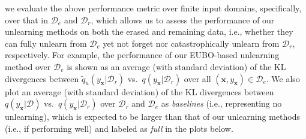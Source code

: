 \documentclass{article}
\theoremstyle{definition}
\newcommand{\mbf}[1]{\mathbf{#1}}
\newcommand{\mcl}[1]{\mathcal{#1}}
\newcommand{\mbb}[1]{\mathbb{#1}}
\newcommand{\da}{\mcl{D}}
\newcommand{\dc}{\mcl{D}_r}
\newcommand{\dr}{\mcl{D}_e}
\newcommand{\eubo}{\tilde{q}_u}
\newcommand{\elbo}{\tilde{q}_v}
\begin{document}
we evaluate the above performance metric over  finite input domains, specifically, over that in $\dr$ and $\dc$, which allows us to assess the 
performance of our unlearning methods on both the erased and remaining data, i.e., whether they can fully unlearn from $\dr$ yet not forget nor catastrophically unlearn from $\dc$, respectively.
For example, the performance of our EUBO-based unlearning method over $\dr$ is shown as an average (with standard deviation) of the KL divergences between $\eubo(y_{\mbf{x}}|\dc)$ vs.~$q(y_{\mbf{x}}|\dc)$ over all $(\mbf{x},y_{\mbf{x}}) \in \dr$.
%
We also plot an average (with standard deviation) of the KL divergences between $q(y_{\mbf{x}}|\da)$ vs.~$q(y_{\mbf{x}}|\dc)$ over $\dc$ and $\dr$ as \emph{baselines} (i.e., representing no unlearning), which is expected to be larger than that of our unlearning methods (i.e., if performing well)
and labeled as \emph{full} in the plots below.
%
\end{document}
